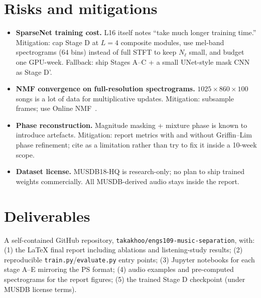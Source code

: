 \documentclass[11pt]{article}
\begin{document}
\section{Risks and mitigations}
\begin{itemize}
\item \textbf{SparseNet training cost.}  L16 itself notes ``take much longer
training time.''  Mitigation: cap Stage D at $L\!=\!4$ composite modules,
use mel-band spectrograms ($64$ bins) instead of full STFT to keep
$N_\ell$ small, and budget one GPU-week.  Fallback: ship Stages A--C +
a small UNet-style mask CNN as Stage D'.
\item \textbf{NMF convergence on full-resolution spectrograms.}
$1025\!\times\!860\!\times\!100$ songs is a lot of data for multiplicative
updates.  Mitigation: subsample frames; use Online NMF~\cite{onlinenmf}.
\item \textbf{Phase reconstruction.}  Magnitude masking + mixture phase is
known to introduce artefacts.  Mitigation: report metrics with and without
Griffin--Lim phase refinement; cite as a limitation rather than try to
fix it inside a 10-week scope.
\item \textbf{Dataset license.}  MUSDB18-HQ is research-only; no plan to
ship trained weights commercially.  All MUSDB-derived audio stays
inside the report.
\end{itemize}

\section{Deliverables}
A self-contained GitHub repository,
\texttt{takakhoo/engs109-music-separation}, with:
(1) the LaTeX final report including ablations and listening-study
results; (2) reproducible \texttt{train.py}/\texttt{evaluate.py} entry
points; (3) Jupyter notebooks for each stage A--E mirroring the PS
format; (4) audio examples and pre-computed spectrograms for the
report figures; (5) the trained Stage D checkpoint (under MUSDB
license terms).
\end{document}

